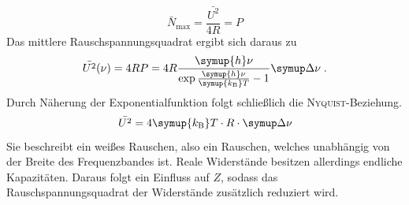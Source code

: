 %
\begin{equation}
  \bar{N}_\text{max}=\frac{\bar{U^2}}{4R}=P
\end{equation}
%
Das mittlere Rauschspannungsquadrat ergibt sich daraus zu
%
\begin{equation}
  \bar{U^2}(\nu)=4RP=4R\frac{\symup{h}\nu}{\exp{\frac{\symup{h}\nu}{\symup{k_\text{B}}T}}-1}\upD\nu\; .
\end{equation}
%
Durch Näherung der Exponentialfunktion folgt schließlich die \textsc{Nyquist}-Beziehung.
%
\begin{equation}
  \bar{U^2}=4\symup{k_\text{B}}T\cdot R\cdot\upD\nu
\end{equation}
%
Sie beschreibt ein weißes Rauschen, also ein Rauschen, welches unabhängig von der Breite des Frequenzbandes ist. Reale Widerstände besitzen allerdings endliche Kapazitäten. Daraus folgt ein Einfluss auf $Z$, sodass das Rauschspannungsquadrat der Widerstände zusätzlich reduziert wird.

